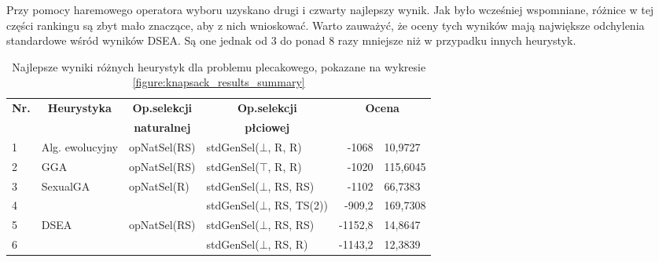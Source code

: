 \documentclass[./FM_mgr.tex]{subfiles}
\begin{document}
Przy pomocy haremowego operatora wyboru uzyskano drugi i czwarty najlepszy wynik.
Jak było wcześniej wspomniane, różnice w tej części rankingu są zbyt mało znaczące, aby z nich wnioskować.
Warto zauważyć, że oceny tych wyników mają największe odchylenia standardowe wśród wyników DSEA.
Są one jednak od 3 do ponad 8 razy mniejsze niż w przypadku innych heurystyk.

\begin{table}[H]
	\centering
	\caption{Najlepsze wyniki różnych heurystyk dla problemu plecakowego, pokazane na wykresie \ref{figure:knapsack_results_summary} \label{table:knapsack_results_summary}}
	\begin{tabular}{|l|l|l|l|r@{$\pm$}l|}
		\hline
		\multicolumn{1}{|c|}{\multirow{2}{*}{{\bf Nr.}}} & \multicolumn{1}{c|}{\multirow{2}{*}{{\bf Heurystyka}}} & \multicolumn{1}{c|}{{\bf Op.selekcji}} & \multicolumn{1}{c|}{{\bf Op.selekcji}} & \multicolumn{2}{c|}{\multirow{2}{*}{{\bf Ocena}}} \\
		& \multicolumn{1}{c|}{}                                  & \multicolumn{1}{c|}{{\bf naturalnej}}    & \multicolumn{1}{c|}{{\bf płciowej}}  & \multicolumn{2}{c|}{}                             \\ \hline \hline
		1 & Alg. ewolucyjny                                         & opNatSel(RS)                           & stdGenSel($\bot$, R, R)                & -1068                   & 10,9727                 \\ \hline
		2 & GGA                                                     & opNatSel(RS)                           & stdGenSel($\top$, R, R)                & -1020                   & 115,6045                \\ \hline
		3 & \multirow{2}{*}{SexualGA}                               & \multirow{2}{*}{opNatSel(R)}           & stdGenSel($\bot$, RS, RS)              & -1102                   & 66,7383                 \\ \cline{1-1}\cline{4-6} 
		4 & &                                        & stdGenSel($\bot$, RS, TS(2))           & -909,2                  & 169,7308                \\ \hline
		5 & \multirow{6}{*}{DSEA}                                   & \multirow{6}{*}{opNatSel(RS)}          & stdGenSel($\bot$, RS, RS)              & -1152,8                 & 14,8647                 \\ \cline{1-1}\cline{4-6} 
		6 & &                                        & stdGenSel($\bot$, RS, R)               & -1143,2                 & 12,3839                 \\ \cline{1-1}\cline{4-6} 

\end{tabular}
\end{table}
\end{document}
